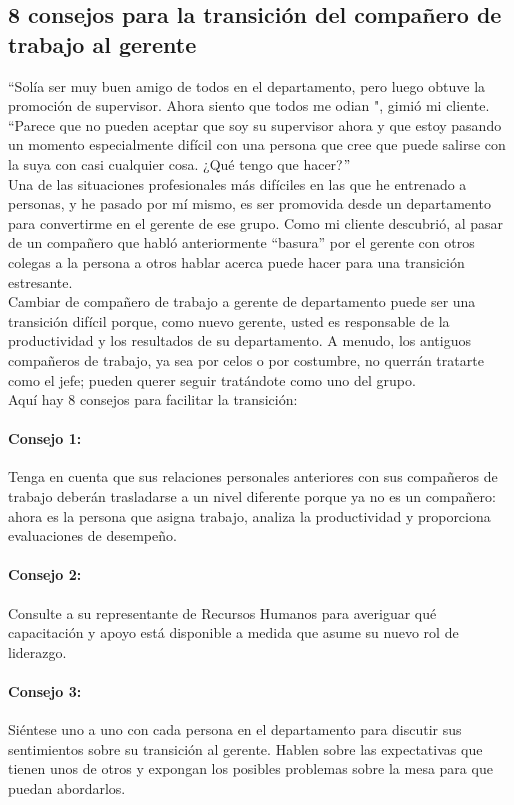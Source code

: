 \documentclass[10pt]{book}
\begin{document}
\subsection{8 consejos para la transición del compañero de trabajo al gerente}
$“$Solía ser muy buen amigo de todos en el departamento, pero luego obtuve la promoción de supervisor. Ahora siento que todos me odian ", gimió mi cliente. “Parece que no pueden aceptar que soy su supervisor ahora y que estoy pasando un momento especialmente difícil con una persona que cree que puede salirse con la suya con casi cualquier cosa. ¿Qué tengo que hacer?$"$\\
Una de las situaciones profesionales más difíciles en las que he entrenado a personas, y he pasado por mí mismo, es ser promovida desde un departamento para convertirme en el gerente de ese grupo. Como mi cliente descubrió, al pasar de un compañero que habló anteriormente “basura” por el gerente con otros colegas a la persona a otros hablar acerca puede hacer para una transición estresante.\\
Cambiar de compañero de trabajo a gerente de departamento puede ser una transición difícil porque, como nuevo gerente, usted es responsable de la productividad y los resultados de su departamento. A menudo, los antiguos compañeros de trabajo, ya sea por celos o por costumbre, no querrán tratarte como el jefe; pueden querer seguir tratándote como uno del grupo.\\
Aquí hay 8 consejos para facilitar la transición:
\paragraph{Consejo 1:}
Tenga en cuenta que sus relaciones personales anteriores con sus compañeros de trabajo deberán trasladarse a un nivel diferente porque ya no es un compañero: ahora es la persona que asigna trabajo, analiza la productividad y proporciona evaluaciones de desempeño.
\paragraph{Consejo 2:}  Consulte a su representante de Recursos Humanos para averiguar qué capacitación y apoyo está disponible a medida que asume su nuevo rol de liderazgo.
\paragraph{Consejo 3:}Siéntese uno a uno con cada persona en el departamento para discutir sus sentimientos sobre su transición al gerente. Hablen sobre las expectativas que tienen unos de otros y expongan los posibles problemas sobre la mesa para que puedan abordarlos.
\end{document}
